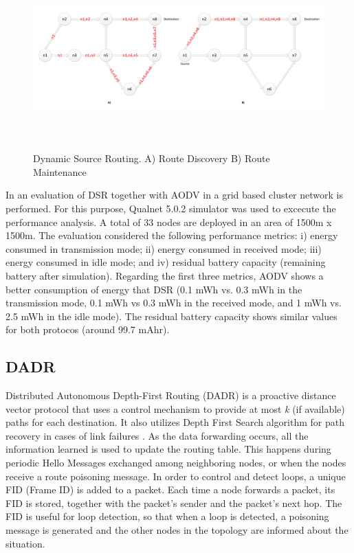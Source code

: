 \documentclass[11pt,draftclsnofoot,onecolumn]{IEEEtran}
\begin{document}
\begin{figure}[h!]
\centering
\includegraphics [height=7cm] {DSR}
\caption{Dynamic Source Routing. A) Route Discovery  B) Route Maintenance}
\label{fig:dsrFigure}
\end{figure}

In \cite{PratibhaKevre2014} an evaluation of DSR together with AODV in a grid based cluster network is  performed. For this purpose, Qualnet 5.0.2 simulator was used to excecute the performance analysis. A total of 33 nodes are deployed in an area of 1500m x 1500m. The evaluation considered the following performance metrics: i) energy consumed in transmission mode; ii) energy consumed in received mode; iii)  energy consumed in idle mode; and iv) residual battery capacity (remaining battery after simulation). Regarding the first three metrics, AODV shows a better consumption of energy that DSR (0.1 mWh vs. 0.3 mWh in the transmission mode, 0.1 mWh vs 0.3 mWh in the received mode, and 1 mWh vs. 2.5 mWh in the idle mode).  The residual battery capacity shows similar values for both protocos (around 99.7 mAhr). 

\subsection{DADR}\label{dadr}

Distributed Autonomous Depth-First Routing (DADR) \cite{Iwao2009} is a proactive distance vector protocol that uses a control mechanism to provide at most \textit{k} (if available) paths for each destination. It also utilizes Depth First Search algorithm for path recovery in cases of link failures \cite{Cespedes2012}. As the data forwarding occurs, all the information learned is used to update the routing table. This happens during periodic Hello Messages exchanged among neighboring nodes, or when the nodes receive a route poisoning message. In order to control and detect loops, a unique FID (Frame ID) is added to a packet. Each time a node forwards a packet, its FID is stored, together with the packet's sender and the packet's next hop. The FID is useful for loop detection, so that when a loop is detected, a poisoning message is generated and the other nodes in the topology are informed about the situation.
\end{document}
